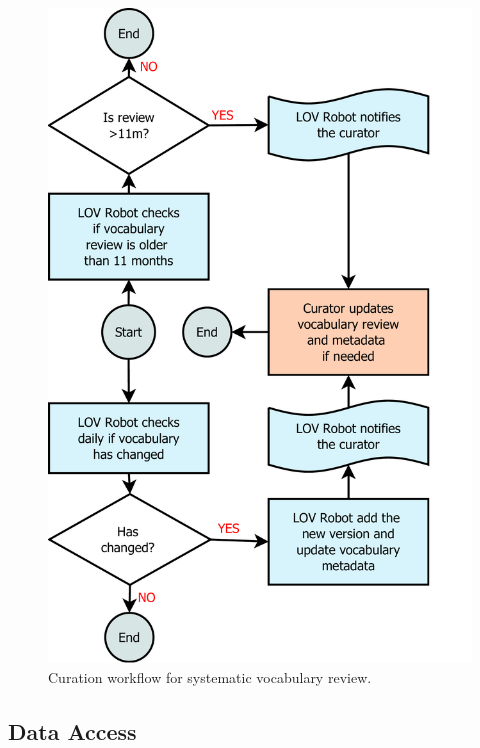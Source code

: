 \documentclass{iosart2c}
\begin{document}
\begin{figure}[ht!b]
\includegraphics[width=1\textwidth]{FlowCharts/DiagramCuration.pdf}
\caption{Curation workflow for systematic vocabulary review.}
\label{fig:reviewWorkflow}
\end{figure}

\subsection{Data Access}
\end{document}
